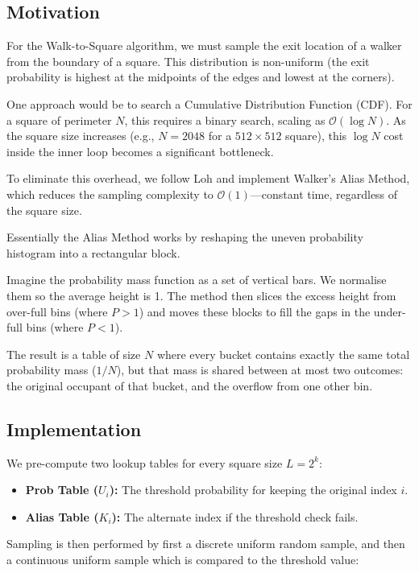 \documentclass[12pt, a4paper, oneside]{report}
\theoremstyle{remark}
\begin{document}
\subsection{Motivation}
For the Walk-to-Square algorithm, we must sample the exit location of a walker from the boundary of a square. This distribution is non-uniform (the exit probability is highest at the midpoints of the edges and lowest at the corners).

One approach would be to search a Cumulative Distribution Function (CDF). For a square of perimeter $N$, this requires a binary search, scaling as $\mathcal{O}(\log N)$. As the square size increases (e.g., $N=2048$ for a $512 \times 512$ square), this $\log N$ cost inside the inner loop becomes a significant bottleneck.

To eliminate this overhead, we follow Loh and implement Walker's Alias Method, which reduces the sampling complexity to $\mathcal{O}(1)$—constant time, regardless of the square size.

Essentially the Alias Method works by reshaping the uneven probability histogram into a rectangular block.

Imagine the probability mass function as a set of vertical bars. We normalise them so the average height is 1. The method then slices the excess height from over-full bins (where $P > 1$) and moves these blocks to fill the gaps in the under-full bins (where $P < 1$).

The result is a table of size $N$ where every bucket contains exactly the same total probability mass ($1/N$), but that mass is shared between at most two outcomes: the original occupant of that bucket, and the overflow from one other bin.

\subsection{Implementation}
We pre-compute two lookup tables for every square size $L=2^k$:
\begin{itemize}
    \item \textbf{Prob Table ($U_i$):} The threshold probability for keeping the original index $i$.
    \item \textbf{Alias Table ($K_i$):} The alternate index if the threshold check fails.
\end{itemize}

Sampling is then performed by first a discrete uniform random sample, and then a continuous uniform sample which is compared to the threshold value:
\end{document}
